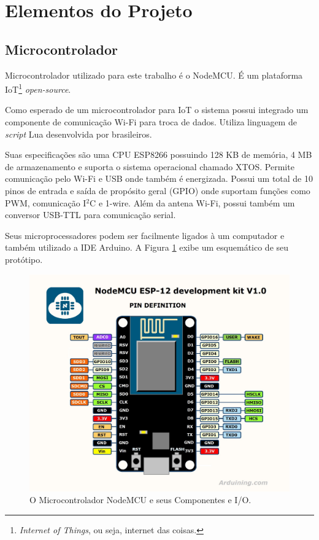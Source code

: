 \documentclass[portugues, brazil, a4paper,12pt]{article}
\begin{document}
	
\section{Elementos do Projeto} \label{sec:elementosProjeto}

	\subsection{Microcontrolador}
		Microcontrolador utilizado para este trabalho é o NodeMCU. É um plataforma IoT\footnote{\textit{Internet of Things}, ou seja, internet das coisas.} \textit{open-source}. 
		
		Como esperado de um microcontrolador para IoT o sistema possui integrado um componente de comunicação Wi-Fi para troca de dados. Utiliza linguagem de \textit{script} Lua desenvolvida por brasileiros.
		
		Suas especificações são uma CPU ESP8266 possuindo 128 KB de memória, 4 MB de armazenamento e suporta o sistema operacional chamado XTOS. Permite comunicação pelo Wi-Fi e USB onde também é energizada. Possui um total de 10 pinos de entrada e saída de propósito geral (GPIO) onde suportam funções como PWM, comunicação I$ ^2 $C e 1-wire. Além da antena Wi-Fi, possui também um conversor USB-TTL para comunicação serial.
		
		Seus microprocessadores podem ser facilmente ligados à um computador e também utilizado a IDE Arduino. A Figura \ref{fig:eq-nodemcu} exibe um esquemático de seu protótipo.
		
		\begin{figure}[t]
			\centering
			\includegraphics[width=0.9\linewidth]{img/eq-nodemcu.jpg}
			\caption{O Microcontrolador NodeMCU e seus Componentes e I/O.}
			\label{fig:eq-nodemcu}
		\end{figure}
		
\end{document}
